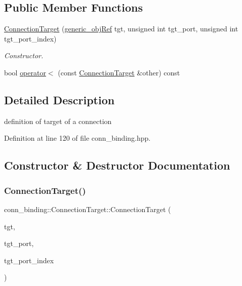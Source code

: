 \subsection*{Public Member Functions}
\begin{DoxyCompactItemize}
\item 
\hyperlink{structconn__binding_1_1ConnectionTarget_a9c1ddca87447de7afdc599ef651e0ea8}{Connection\+Target} (\hyperlink{generic__obj_8hpp_acb533b2ef8e0fe72e09a04d20904ca81}{generic\+\_\+obj\+Ref} tgt, unsigned int tgt\+\_\+port, unsigned int tgt\+\_\+port\+\_\+index)
\begin{DoxyCompactList}\small\item\em Constructor. \end{DoxyCompactList}\item 
bool \hyperlink{structconn__binding_1_1ConnectionTarget_a80bbf9e2f995bebb778067e5ea2b2414}{operator$<$} (const \hyperlink{structconn__binding_1_1ConnectionTarget}{Connection\+Target} \&other) const
\end{DoxyCompactItemize}


\subsection{Detailed Description}
definition of target of a connection 

Definition at line 120 of file conn\+\_\+binding.\+hpp.



\subsection{Constructor \& Destructor Documentation}
\mbox{\label{structconn__binding_1_1ConnectionTarget_a9c1ddca87447de7afdc599ef651e0ea8}} 
\subsubsection{\texorpdfstring{Connection\+Target()}{ConnectionTarget()}}
{\footnotesize\ttfamily conn\+\_\+binding\+::\+Connection\+Target\+::\+Connection\+Target (\begin{DoxyParamCaption}\item[{\hyperlink{generic__obj_8hpp_acb533b2ef8e0fe72e09a04d20904ca81}{generic\+\_\+obj\+Ref}}]{tgt,  }\item[{unsigned int}]{tgt\+\_\+port,  }\item[{unsigned int}]{tgt\+\_\+port\+\_\+index }\end{DoxyParamCaption})}




